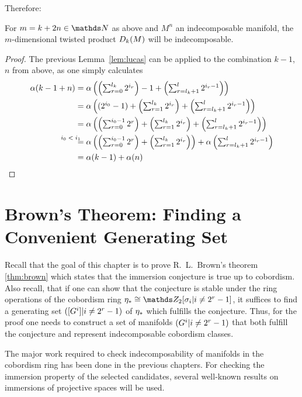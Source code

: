 Therefore:
\begin{Cor}\label{cor:twistedprod:indecompcriterion}
  For $m=k+2n\in\Nat$ as above and $M^n$ an indecomposable manifold,
  the $m$-dimensional twisted product $D_{k}({M})$ will be
  indecomposable.
  \begin{proof}
    The previous Lemma~\ref{lem:lucas} can be applied to the
    combination $k-1$, $n$ from above, as one simply calculates
    \begin{align*}
      \alpha(k-1+n)
      &=\textstyle
        \alpha\left(
        \left(\sum_{r=0}^{l_k} 2^{i_r}\right)
        - 1
        + \left(\sum_{r=l_k+1}^{l} 2^{i_r-1}\right)
        \right) \\
      &=\textstyle
        \alpha\left(
        (2^{i_0}-1)
        + \left(\sum_{r=1}^{l_k} 2^{i_r}\right)
        + \left(\sum_{r=l_k+1}^{l} 2^{i_r-1}\right)
        \right) \\
      &=\textstyle
        \alpha\left(
        \left(\sum_{r=0}^{i_0-1} 2^r \right)
        + \left(\sum_{r=1}^{l_k} 2^{i_r}\right)
        + \left(\sum_{r=l_k+1}^{l} 2^{i_r-1}\right)
        \right) \\
      &\textstyle
        \equalsby{$i_0<i_1$}
        \alpha\left(
        \left(\sum_{r=0}^{i_0-1} 2^r \right)
        + \left(\sum_{r=1}^{l_k} 2^{i_r}\right)
        \right)
        + \alpha\left(\sum_{r=l_k+1}^{l} 2^{i_r-1}\right)
      \\
      &= \alpha(k-1) + \alpha(n)
    \end{align*}
  \end{proof}
\end{Cor}


\section
{Brown's Theorem: Finding a Convenient Generating Set}
\label{sec:proofbrown}
Recall that the goal of this chapter is to prove R.~L.~Brown's
theorem \ref{thm:brown} which states that the immersion conjecture is
true up to cobordism.
Also recall, that if one can show that the conjecture is stable
under the ring operations of the cobordism ring
$\c_*\cong\Zmod2[\sigma_i|i\neq2^r-1]$, it suffices to find a
generating set $([G^{i}]|i\neq2^r-1)$ of $\eta_*$ which fulfills the conjecture.
Thus, for the proof one needs to construct a set of manifolds
$(G^{i}|i\neq2^r-1)$ that both fulfill the conjecture and represent
indecomposable cobordism classes.

The major work required to check indecomposability of manifolds in the
cobordism ring has been done in the previous chapters.
For checking the immersion property of the selected candidates,
several well-known results on immersions of projective spaces
will be used.

